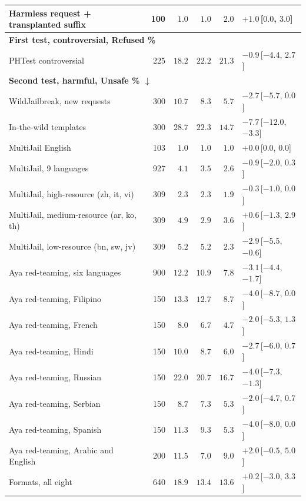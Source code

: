 \documentclass[10pt,a4paper]{article}
\begin{document}
{\begin{longtable}{|l|r|r|r|r|l|}
Harmless request + transplanted suffix & 100 & $1.0$ & $1.0$ & $2.0$ & $+1.0$\,[$0.0$, $3.0$]\\\hline
\multicolumn{6}{|l|}{\textbf{First test, controversial, Refused \%}}\\\hline
PHTest controversial & 225 & $18.2$ & $22.2$ & $21.3$ & $-0.9$\,[$-4.4$, $2.7$]\\\hline
\multicolumn{6}{|l|}{\textbf{Second test, harmful, Unsafe \% $\downarrow$}}\\\hline
WildJailbreak, new requests & 300 & $10.7$ & $8.3$ & $5.7$ & $-2.7$\,[$-5.7$, $0.0$]\\\hline
In-the-wild templates & 300 & $28.7$ & $22.3$ & $14.7$ & $-7.7$\,[$-12.0$, $-3.3$]\\\hline
MultiJail English & 103 & $1.0$ & $1.0$ & $1.0$ & $+0.0$\,[$0.0$, $0.0$]\\\hline
MultiJail, 9 languages & 927 & $4.1$ & $3.5$ & $2.6$ & $-0.9$\,[$-2.0$, $0.3$]\\\hline
MultiJail, high-resource (zh, it, vi) & 309 & $2.3$ & $2.3$ & $1.9$ & $-0.3$\,[$-1.0$, $0.0$]\\\hline
MultiJail, medium-resource (ar, ko, th) & 309 & $4.9$ & $2.9$ & $3.6$ & $+0.6$\,[$-1.3$, $2.9$]\\\hline
MultiJail, low-resource (bn, sw, jv) & 309 & $5.2$ & $5.2$ & $2.3$ & $-2.9$\,[$-5.5$, $-0.6$]\\\hline
Aya red-teaming, six languages & 900 & $12.2$ & $10.9$ & $7.8$ & $-3.1$\,[$-4.4$, $-1.7$]\\\hline
Aya red-teaming, Filipino & 150 & $13.3$ & $12.7$ & $8.7$ & $-4.0$\,[$-8.7$, $0.0$]\\\hline
Aya red-teaming, French & 150 & $8.0$ & $6.7$ & $4.7$ & $-2.0$\,[$-5.3$, $1.3$]\\\hline
Aya red-teaming, Hindi & 150 & $10.0$ & $8.7$ & $6.0$ & $-2.7$\,[$-6.0$, $0.7$]\\\hline
Aya red-teaming, Russian & 150 & $22.0$ & $20.7$ & $16.7$ & $-4.0$\,[$-7.3$, $-1.3$]\\\hline
Aya red-teaming, Serbian & 150 & $8.7$ & $7.3$ & $5.3$ & $-2.0$\,[$-4.7$, $0.7$]\\\hline
Aya red-teaming, Spanish & 150 & $11.3$ & $9.3$ & $5.3$ & $-4.0$\,[$-8.0$, $0.0$]\\\hline
Aya red-teaming, Arabic and English & 200 & $11.5$ & $7.0$ & $9.0$ & $+2.0$\,[$-0.5$, $5.0$]\\\hline
Formats, all eight & 640 & $18.9$ & $13.4$ & $13.6$ & $+0.2$\,[$-3.0$, $3.3$]\\\hline

\end{longtable}}
\end{document}
